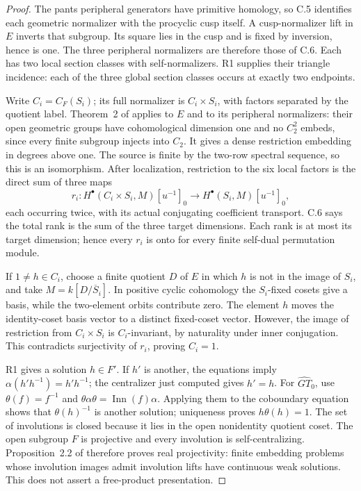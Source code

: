 \begin{proof}
The pants peripheral generators have primitive homology,
so C.5 identifies each geometric normalizer with the
procyclic cusp itself.  A cusp-normalizer lift in $E$
inverts that subgroup.  Its square lies in the cusp and
is fixed by inversion, hence is one.  The three
peripheral normalizers are therefore those of C.6.
Each has two local section classes with self-normalizers.
R1 supplies their triangle incidence: each of the three
global section classes occurs at exactly two endpoints.

Write $C_i=C_F(S_i)$; its full normalizer is
$C_i\times S_i$, with factors separated by the
quotient label.  Theorem~2 of
\cite{CEKochloukovaZalesskii2007} applies to $E$ and
to its peripheral normalizers: their open geometric
groups have cohomological dimension one and no
$C_2^2$ embeds, since every finite subgroup injects
into $C_2$.  It gives a dense restriction embedding
in degrees above one.  The source is finite by the
two-row spectral sequence, so this is an isomorphism.
After localization, restriction to the six local
factors is the direct sum of three maps
\[
 r_i:H^\bullet(C_i\times S_i,M)[u^{-1}]_0
       \longrightarrow H^\bullet(S_i,M)[u^{-1}]_0,
\]
each occurring twice, with its actual conjugating
coefficient transport.  C.6 says the total rank is
the sum of the three target dimensions.  Each rank
is at most its target dimension; hence every $r_i$
is onto for every finite self-dual permutation module.

If $1\ne h\in C_i$, choose a finite quotient $D$ of
$E$ in which $h$ is not in the image of $S_i$, and
take $M=k[D/\overline S_i]$.  In positive cyclic
cohomology the $S_i$-fixed cosets give a basis, while
the two-element orbits contribute zero.  The element
$h$ moves the identity-coset basis vector to a
distinct fixed-coset vector.  However, the image of
restriction from $C_i\times S_i$ is $C_i$-invariant,
by naturality under inner conjugation.  This
contradicts surjectivity of $r_i$, proving $C_i=1$.

R1 gives a solution $h\in F'$.  If $h'$ is another,
the equations imply $\alpha(h'h^{-1})=h'h^{-1}$;
the centralizer just computed gives $h'=h$.
For $\widehat{GT}_0$, use
$\theta(f)=f^{-1}$ and
$\theta\alpha\theta=\operatorname{Inn}(f)\alpha$.
Applying them to the coboundary equation shows that
$\theta(h)^{-1}$ is another solution; uniqueness
proves $h\theta(h)=1$.
The set of involutions is closed because it lies
in the open nonidentity quotient coset.  The open
subgroup $F$ is projective and every involution is
self-centralizing.  Proposition~2.2 of
\cite{CEHaran1993} therefore proves real projectivity:
finite embedding problems whose involution images
admit involution lifts have continuous weak solutions.
This does not assert a free-product presentation.
\end{proof}

